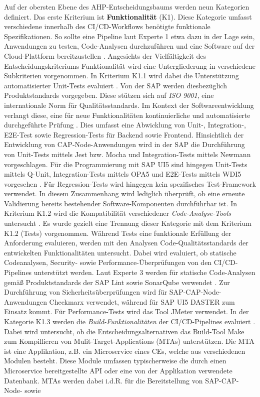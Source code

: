 Auf der obersten Ebene des AHP-Entscheidungsbaums werden neun Kategorien definiert. Das erste Kriterium ist \textbf{Funktionalität} (K1). Diese Kategorie umfasst verschiedene innerhalb des CI/CD-Workflows benötigte funktionale Spezifikationen. So sollte eine Pipeline laut Experte 1 etwa dazu in der Lage sein, Anwendungen zu testen, Code-Analysen durchzuführen und eine Software auf der Cloud-Plattform bereitzustellen \cite[Z. 52]{ProductOwnerSAPBTPProd&Infra.}. Angesichts der Vielfältigkeit des Entscheidungskriteriums Funktionalität wird eine Untergliederung in verschiedene Subkriterien vorgenommen. In Kriterium K1.1 wird dabei die Unterstützung automatisierter Unit-Tests evaluiert \cite[Z. 16]{SoftwareArchitektSAPDTSIntegration.}. Von der SAP werden diesbezüglich Produktstandards vorgegeben. Diese stützen sich auf \textit{ISO 9001}, eine internationale Norm für Qualitätsstandards. Im Kontext der Softwareentwicklung verlangt diese, eine für neue Funktionalitäten kontinuierliche und automatisierte durchgeführte Prüfung \cite[Z. 61]{TestDeveloperSAPHyperspaceAdoption&Onboarding.b}. Dies umfasst eine Abwicklung von Unit-, Integration-, E2E-Test sowie Regression-Tests für Backend sowie Frontend. Hinsichtlich der Entwicklung von CAP-Node-Anwendungen wird in der SAP die Durchführung von Unit-Tests mittels Jest bzw. Mocha und Integration-Tests mittels Newmann vorgeschlagen. Für die Programmierung mit SAP UI5 sind hingegen Unit-Tests mittels Q-Unit, Integration-Tests mittels OPA5 und E2E-Tests mittels WDI5 vorgesehen \cite[Z. 62 ff.]{TestDeveloperSAPHyperspaceAdoption&Onboarding.b}. Für Regression-Tests wird hingegen kein spezifisches Test-Framework verwendet. In diesem Zusammenhang wird lediglich überprüft, ob eine erneute Validierung bereits bestehender Software-Komponenten durchführbar ist. In Kriterium K1.2 wird die Kompatibilität verschiedener \textit{Code-Analyse-Tools} untersucht \cite[Z. 67 ff.]{ProductOwnerSAPBTPProd&Infra.}. Es wurde gezielt eine Trennung dieser Kategorie mit dem Kriterium K1.2 (Tests) vorgenommen. Während Tests eine funktionale Erfüllung der Anforderung evaluieren, werden  mit den Analysen Code-Qualitätsstandards der entwickelten Funktionalitäten untersucht. Dabei wird evaluiert, ob statische Codeanalysen, Security- sowie Performance-Überprüfungen von den CI/CD-Pipelines unterstützt werden. Laut Experte 3 werden für statische Code-Analysen gemäß Produktstandards der SAP Lint sowie SonarQube verwendet \cite[Z. 41]{ProductManagerSAPHyperspaceSecurityTools.}. Zur Durchführung von Sicherheitsüberprüfungen wird für SAP-CAP-Node-Anwendungen Checkmarx verwendet, während für SAP UI5 DASTER zum Einsatz kommt. Für Performance-Tests wird das Tool JMeter verwendet. In der Kategorie K1.3 werden die \textit{Build-Funktionalitäten} der CI/CD-Pipelines evaluiert \cite[Z. 67 ff.]{ProductOwnerSAPBTPProd&Infra.}. Dabei wird untersucht, ob die Entscheidungsalternativen das Build-Tool Make zum Kompillieren von Mulit-Target-Applications (\acs{MTA}s) unterstützen. Die MTA ist eine Applikation, z.B. ein Microservice eines CEs, welche aus verschiedenen Modulen besteht. Diese Module umfassen typischerweise die durch einen Microservice bereitgestellte API oder eine von der Applikation verwendete Datenbank. MTAs werden dabei i.d.R. für die Bereitstellung von SAP-CAP-Node- sowie 